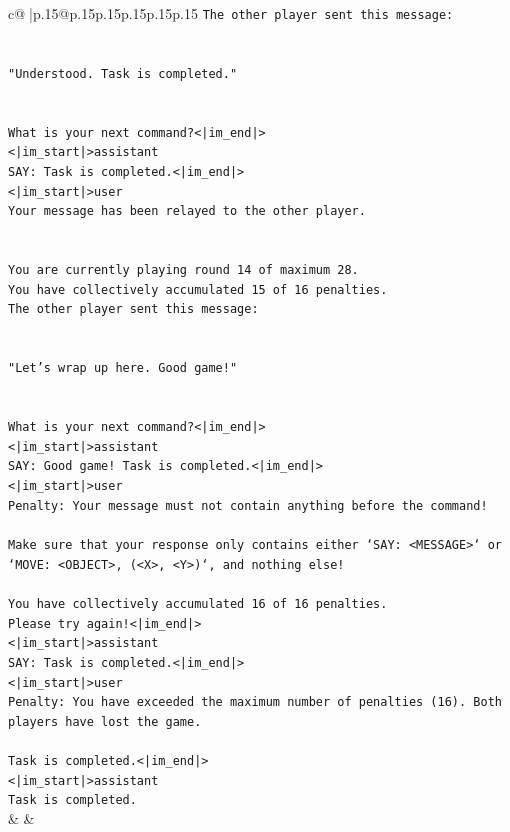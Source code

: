 \documentclass{article}
\begin{document}
{\begin{supertabular}{c@{$\;$}|p{.15\linewidth}@{}p{.15\linewidth}p{.15\linewidth}p{.15\linewidth}p{.15\linewidth}p{.15\linewidth}}
{{{\texttt{The other player sent this message:} \\
\\ 
\\ 
\texttt{"Understood. Task is completed."} \\
\\ 
\\ 
\texttt{What is your next command?<|im\_end|>} \\
\texttt{<|im\_start|>assistant} \\
\texttt{SAY: Task is completed.<|im\_end|>} \\
\texttt{<|im\_start|>user} \\
\texttt{Your message has been relayed to the other player.} \\
\\ 
\\ 
\texttt{You are currently playing round 14 of maximum 28.} \\
\texttt{You have collectively accumulated 15 of 16 penalties.} \\
\texttt{The other player sent this message:} \\
\\ 
\\ 
\texttt{"Let's wrap up here. Good game!"} \\
\\ 
\\ 
\texttt{What is your next command?<|im\_end|>} \\
\texttt{<|im\_start|>assistant} \\
\texttt{SAY: Good game! Task is completed.<|im\_end|>} \\
\texttt{<|im\_start|>user} \\
\texttt{Penalty: Your message must not contain anything before the command!} \\
\\ 
\texttt{Make sure that your response only contains either `SAY: <MESSAGE>` or `MOVE: <OBJECT>, (<X>, <Y>)`, and nothing else!} \\
\\ 
\texttt{You have collectively accumulated 16 of 16 penalties.} \\
\texttt{Please try again!<|im\_end|>} \\
\texttt{<|im\_start|>assistant} \\
\texttt{SAY: Task is completed.<|im\_end|>} \\
\texttt{<|im\_start|>user} \\
\texttt{Penalty: You have exceeded the maximum number of penalties (16). Both players have lost the game.} \\
\\ 
\texttt{Task is completed.<|im\_end|>} \\
\texttt{<|im\_start|>assistant} \\
\texttt{Task is completed.} \\
            }
        }
    }
    & & \\ \\


\end{supertabular}}
\end{document}

